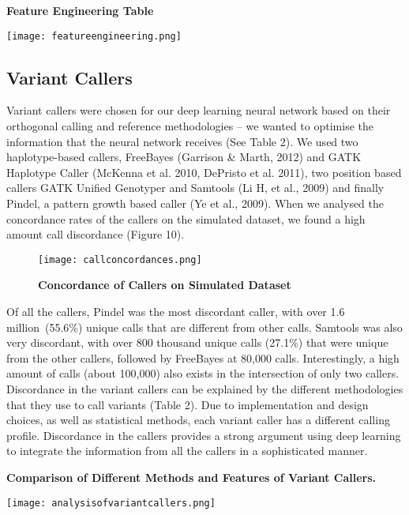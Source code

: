 \documentclass{article}
\begin{document}
\begin{table}[H]
\caption{\textbf{Feature Engineering Table}}
\texttt{[image: featureengineering.png]}
\centering
\end{table}
\subsection{Variant Callers}
Variant callers were chosen for our deep learning neural network based on their orthogonal calling and reference methodologies -- we wanted to optimise the information that the neural network receives (See Table 2). We used two haplotype-based callers, FreeBayes (Garrison \& Marth, 2012) and GATK Haplotype Caller (McKenna et al. 2010, DePristo et al. 2011), two position based callers GATK Unified Genotyper and Samtools (Li H, et al., 2009) and finally Pindel, a pattern growth based caller (Ye et al., 2009). When we analysed the concordance rates of the callers on the simulated dataset, we found a high amount call discordance (Figure 10).
\begin{figure}[H]
\texttt{[image: callconcordances.png]}
\centering
\caption{\textbf{Concordance of Callers on Simulated Dataset}}
\end{figure} 
Of all the callers, Pindel was the most discordant caller, with over 1.6 million\ (55.6\%) unique calls that are different from other calls. Samtools was also very discordant, with over 800 thousand unique calls (27.1\%) that were unique from the other callers, followed by FreeBayes at 80,000 calls. Interestingly, a high amount of calls (about 100,000) also exists in the intersection of only two callers. Discordance in the variant callers can be explained by the different methodologies that they use to call variants (Table 2). Due to implementation and design choices, as well as statistical methods, each variant caller has a different calling profile. Discordance in the callers provides a strong argument using deep learning to integrate the information from all the callers in a sophisticated manner.\\

\begin{table}[H]
\caption{\textbf{Comparison of Different Methods and Features of Variant Callers.}}
\texttt{[image: analysisofvariantcallers.png]}
\centering
\end{table}
\end{document}
